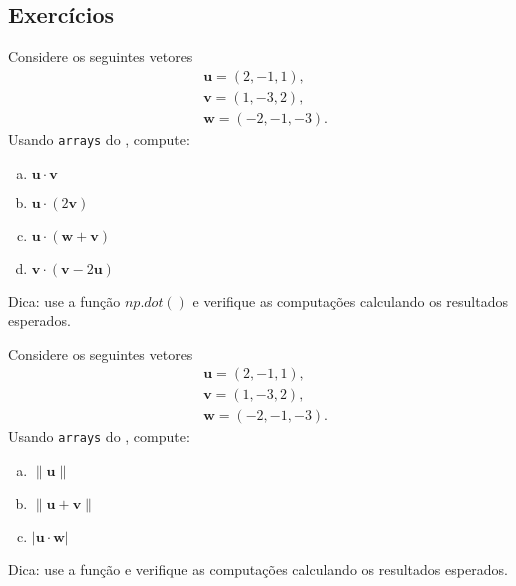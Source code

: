 \subsection{Exercícios}

\begin{exer}
  Considere os seguintes vetores
  \begin{align}
    & \pmb{u} = (2, -1, 1), \\
    & \pmb{v} = (1, -3, 2), \\
    & \pmb{w} = (-2, -1, -3).
  \end{align}
  Usando \texttt{arrays} do {\numpy}, compute:
  \begin{enumerate}[a)]
  \item $\pmb{u}\cdot\pmb{v}$
  \item $\pmb{u}\cdot (2\pmb{v})$
  \item $\pmb{u}\cdot (\pmb{w} + \pmb{v})$
  \item $\pmb{v}\cdot (\pmb{v} - 2\pmb{u})$
  \end{enumerate}
\end{exer}
\begin{resp}
  Dica: use a função $np.dot()$ e verifique as computações calculando os resultados esperados.
\end{resp}

\begin{exer}
  Considere os seguintes vetores
  \begin{align}
    & \pmb{u} = (2, -1, 1), \\
    & \pmb{v} = (1, -3, 2), \\
    & \pmb{w} = (-2, -1, -3).
  \end{align}
  Usando \texttt{arrays} do {\numpy}, compute:
  \begin{enumerate}[a)]
  \item $\|\pmb{u}\|$
  \item $\|\pmb{u} + \pmb{v}\|$
  \item $|\pmb{u}\cdot \pmb{w}|$
  \end{enumerate}
\end{exer}
\begin{resp}
  Dica: use a função {\PYTHONnumpyDOTlinalgDOTnorm} e verifique as computações calculando os resultados esperados.
\end{resp}

